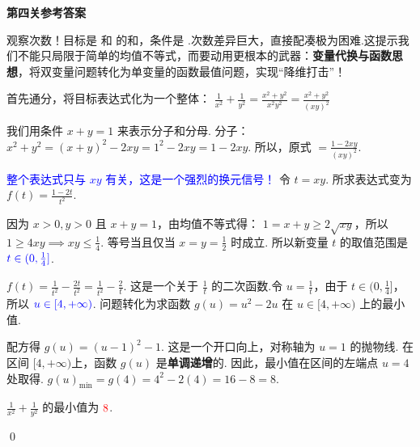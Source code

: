\begin{solution}
	\textbf{第四关参考答案}

	\textcolor{green!50!black}{观察次数！目标是  和  的和，条件是 .次数差异巨大，直接配凑极为困难.这提示我们不能只局限于简单的均值不等式，而要动用更根本的武器：\textbf{变量代换与函数思想}，将双变量问题转化为单变量的函数最值问题，实现“降维打击”！}

		首先通分，将目标表达式化为一个整体：
		$\frac{1}{x^2} + \frac{1}{y^2} = \frac{x^2+y^2}{x^2y^2} = \frac{x^2+y^2}{(xy)^2}$
		
		我们用条件 $x+y=1$ 来表示分子和分母.
		分子：$x^2+y^2 = (x+y)^2 - 2xy = 1^2 - 2xy = 1-2xy$.
		所以，原式 $= \frac{1-2xy}{(xy)^2}$.

		\textcolor{blue}{整个表达式只与 $xy$ 有关，这是一个强烈的换元信号！}
		令 $t=xy$. 
		所求表达式变为 $f(t) = \frac{1-2t}{t^2}$.

		因为 $x>0, y>0$ 且 $x+y=1$，由均值不等式得：
		$1 = x+y \ge 2\sqrt{xy}$，所以 $1 \ge 4xy \implies xy \le \frac{1}{4}$.
		等号当且仅当 $x=y=\frac{1}{2}$ 时成立.
		所以新变量 $t$ 的取值范围是 $\textcolor{blue}{t \in (0, \frac{1}{4}]}$.

		$f(t) = \frac{1}{t^2} - \frac{2t}{t^2} = \frac{1}{t^2} - \frac{2}{t}$.
		这是一个关于 $\frac{1}{t}$ 的二次函数.令 $u = \frac{1}{t}$，由于 $t \in (0, \frac{1}{4}]$，所以 $\textcolor{blue}{u \in [4, +\infty)}$.
		问题转化为求函数 $g(u) = u^2 - 2u$ 在 $u \in [4, +\infty)$ 上的最小值.
	
		配方得 $g(u) = (u-1)^2 - 1$. 这是一个开口向上，对称轴为 $u=1$ 的抛物线.
		在区间 $[4, +\infty)$上，函数 $g(u)$ 是\textbf{单调递增}的.
		因此，最小值在区间的左端点 $u=4$ 处取得.
		$g(u)_{\min} = g(4) = 4^2 - 2(4) = 16-8=8$.

	$\frac{1}{x^2}+\frac{1}{y^2}$ 的最小值为 $\textcolor{red}{8}$.
\end{solution}
\qed
